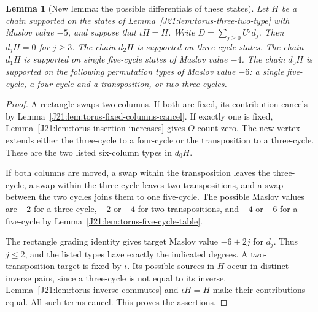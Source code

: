 \documentclass[11pt,oneside]{report}
\newtheorem{lemma}[theorem]{Lemma}
\theoremstyle{definition}
\numberwithin{equation}{section}
\begin{document}
\begin{lemma}[New lemma: the possible differentials of these states]
\label{J21:lem:torus-three-two-boundaries}
Let $H$ be a chain supported on the states of
Lemma~\ref{J21:lem:torus-three-two-type} with Maslov value $-5$, and suppose
that $\iota H=H$. Write $D=\sum_{j\geq0}U^j d_j$.
Then $d_jH=0$ for $j\geq3$. The chain $d_2H$ is supported on
three-cycle states. The chain $d_1H$ is supported on single five-cycle
states of Maslov value $-4$. The chain $d_0H$ is supported on the
following permutation types of Maslov value $-6$: a single five-cycle,
a four-cycle and a transposition, or two three-cycles.
\end{lemma}
\begin{proof}
A rectangle swaps two columns. If both are fixed, its contribution
cancels by Lemma~\ref{J21:lem:torus-fixed-columns-cancel}. If exactly one
is fixed, Lemma~\ref{J21:lem:torus-insertion-increases} gives $O$ count zero.
The new vertex extends either the three-cycle to a four-cycle or the
transposition to a three-cycle. These are the two listed six-column
types in $d_0H$.

If both columns are moved, a swap within the transposition leaves the
three-cycle, a swap within the three-cycle leaves two transpositions,
and a swap between the two cycles joins them to one five-cycle.
The possible Maslov values are $-2$ for a three-cycle, $-2$ or $-4$
for two transpositions, and $-4$ or $-6$ for a five-cycle by
Lemma~\ref{J21:lem:torus-five-cycle-table}.

The rectangle grading identity gives target Maslov value $-6+2j$ for
$d_j$. Thus $j\leq2$, and the listed types have exactly the indicated
degrees. A two-transposition target is fixed by $\iota$. Its possible
sources in $H$ occur in distinct inverse pairs, since a three-cycle is
not equal to its inverse. Lemma~\ref{J21:lem:torus-inverse-commutes} and
$\iota H=H$ make their contributions equal. All such terms cancel.
This proves the assertions.
\end{proof}
\end{document}
